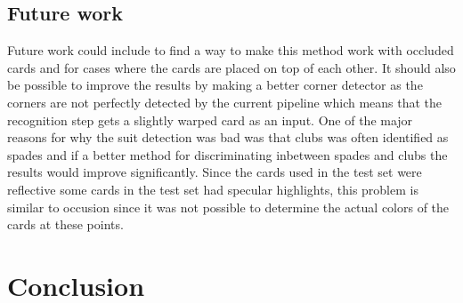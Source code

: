 \documentclass[journal,twoside]{IEEEtran}
\begin{document}

\subsection{Future work}

Future work could include to find a way to make this method work with occluded cards and for cases where the cards are placed on top of each other. It should also be possible to improve the results by making a better corner detector as the corners are not perfectly detected by the current pipeline which means that the recognition step gets a slightly warped card as an input. One of the major reasons for why the suit detection was bad was that clubs was often identified as spades and if a better method for discriminating inbetween spades and clubs the results would improve significantly. Since the cards used in the test set were reflective some cards in the test set had specular highlights, this problem is similar to occusion since it was not possible to determine the actual colors of the cards at these points.



\section{Conclusion}
\end{document}
